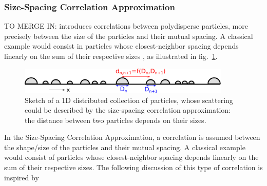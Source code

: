 \subsubsection{Size-Spacing Correlation Approximation}

TO MERGE IN:
introduces correlations between polydisperse particles, more precisely between the size of the particles and their mutual spacing. A classical example would consist in particles whose closest-neighbor spacing depends linearly on the sum of their respective sizes \cite{LaLR07}, as illustrated in fig.~\ref{fig:ssca}.


\begin{figure}[ht]
\begin{center}
\includegraphics[width=0.9\textwidth]{fig/drawing/drawingSSCA.pdf}
\end{center}
\caption{Sketch of a 1D distributed collection of particles, whose scattering could be described by the size-spacing correlation approximation: the distance between two particles depends on their sizes.}
\label{fig:ssca}
\end{figure}


In the Size-Spacing Correlation Approximation, a correlation is assumed between the shape/size of the particles and their mutual spacing. A classical example would consist of particles whose closest-neighbor spacing depends linearly on the sum of their respective sizes. The following discussion of this type of correlation is inspired by \cite{LaLR07}

